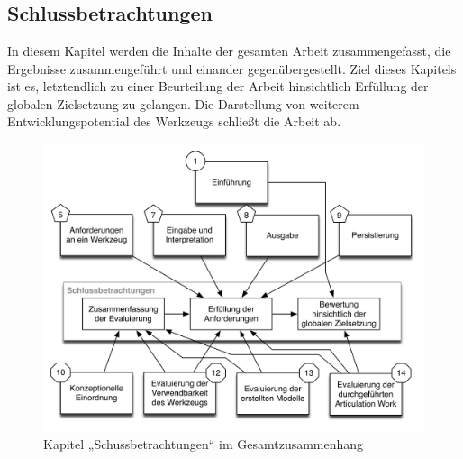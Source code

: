 \part*{}

\chapter{Schlussbetrachtungen} %
\label{cha:schlussbetrachtungen}

In diesem Kapitel werden die Inhalte der gesamten Arbeit zusammengefasst, die Ergebnisse zusammengeführt und einander gegenübergestellt. Ziel dieses Kapitels ist es, letztendlich zu einer Beurteilung der Arbeit hinsichtlich Erfüllung der globalen Zielsetzung zu gelangen. Die Darstellung von weiterem Entwicklungspotential des Werkzeugs schließt die Arbeit ab.

\begin{figure}[htbp]
	\centering
		\includegraphics[scale=0.6]{img/Kontextgrafiken/k15.png}
	\caption{Kapitel „Schussbetrachtungen“ im Gesamtzusammenhang}
	\label{fig:img_Kontextgrafiken_k15}
\end{figure}

